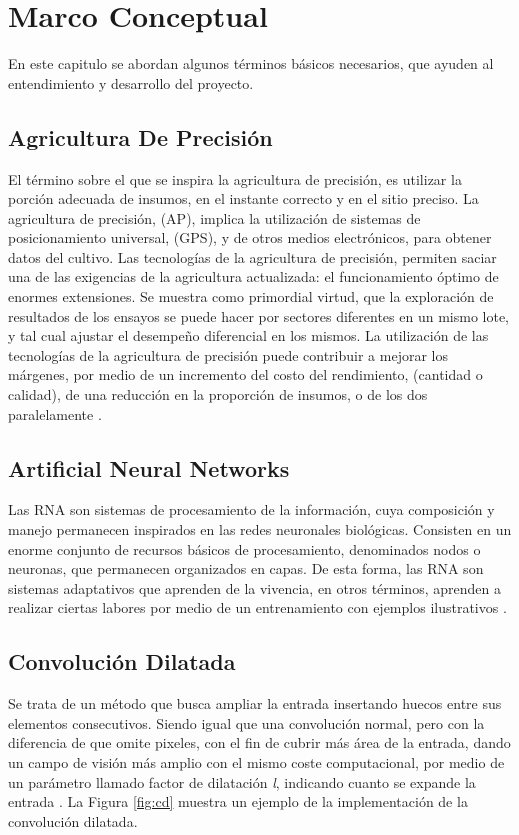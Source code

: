 \chapter{Marco Conceptual}
En este capitulo se abordan algunos términos básicos necesarios, que ayuden al entendimiento y desarrollo del proyecto. 

\section{Agricultura De Precisión} El término sobre el que se inspira la agricultura de precisión, es utilizar la porción adecuada de insumos, en el instante correcto y en el sitio preciso. La agricultura de precisión, (AP), implica la utilización de sistemas de posicionamiento universal, (GPS), y de otros medios electrónicos, para obtener datos del cultivo. Las tecnologías de la agricultura de precisión, permiten saciar una de las exigencias de la agricultura actualizada: el funcionamiento óptimo de enormes extensiones. Se muestra como primordial virtud, que la exploración de resultados de los ensayos se puede hacer por sectores diferentes en un mismo lote, y tal cual ajustar el desempeño diferencial en los mismos. La utilización de las tecnologías de la agricultura de precisión puede contribuir a mejorar los márgenes, por medio de un incremento del costo del rendimiento, (cantidad o calidad), de una reducción en la proporción de insumos, o de los dos paralelamente \cite{ref_10}.

\section{Artificial Neural Networks} Las RNA son sistemas de procesamiento de la información, cuya composición y manejo permanecen inspirados en las redes neuronales biológicas. Consisten en un enorme conjunto de recursos básicos de procesamiento, denominados nodos o neuronas, que permanecen organizados en capas. De esta forma, las RNA son sistemas adaptativos que aprenden de la vivencia, en otros términos, aprenden a realizar ciertas labores por medio de un entrenamiento con ejemplos ilustrativos \cite{ref_11}.
\\ 

\section{Convolución Dilatada}

Se trata de un método que busca ampliar la entrada insertando huecos entre sus elementos consecutivos. Siendo igual que una convolución normal, pero con la diferencia de que omite pixeles, con el fin de cubrir más área de la entrada, dando un campo de visión más amplio con el mismo coste computacional, por medio de un parámetro llamado factor de dilatación \textit{l}, indicando cuanto se expande la entrada \cite{wu2019fastfcn}. La Figura \ref{fig:cd} muestra un ejemplo de la implementación de la convolución dilatada.

